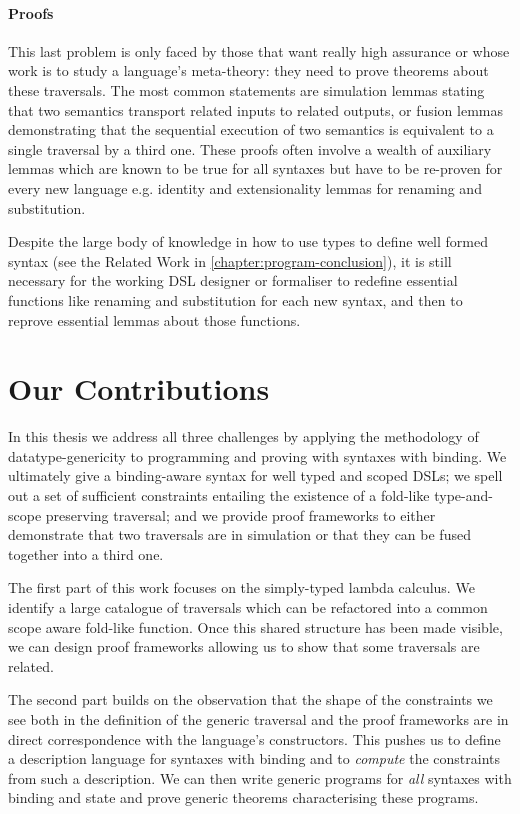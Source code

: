 \paragraph{Proofs} This last problem is only faced by those that want really high assurance or whose
work is to study a language's meta-theory: they need to prove theorems about these
traversals. The most common statements are simulation lemmas stating that two
semantics transport related inputs to related outputs, or fusion lemmas demonstrating
that the sequential execution of two semantics is equivalent to a single traversal
by a third one. These proofs often involve a wealth of auxiliary lemmas which are
known to be true for all syntaxes but have to be re-proven for every new language
e.g. identity and extensionality lemmas for renaming and substitution.

Despite the large body of knowledge in how to use types to define well formed
syntax (see the Related Work in \cref{chapter:program-conclusion}), it is still
necessary for the working DSL designer or formaliser to redefine essential
functions like renaming and substitution for each new syntax, and then to
reprove essential lemmas about those functions.

\section{Our Contributions}

In this thesis we address all three challenges by applying the methodology of
datatype-genericity to programming and proving with syntaxes with binding.
We ultimately give a binding-aware syntax for well typed and scoped DSLs; we
spell out a set of sufficient constraints entailing the existence of a fold-like
type-and-scope preserving traversal; and we provide proof frameworks
to either demonstrate that two traversals are in simulation or that they can be
fused together into a third one.

The first part of this work focuses on the simply-typed lambda calculus. We
identify a large catalogue of traversals which can be refactored into a common
scope aware fold-like function. Once this shared structure has been made
visible, we can design proof frameworks allowing us to show that some traversals
are related.

The second part builds on the observation that the shape of the constraints we
see both in the definition of the generic traversal and the proof frameworks
are in direct correspondence with the language's constructors. This pushes us
to define a description language for syntaxes with binding and to \emph{compute}
the constraints from such a description. We can then write generic programs for
\emph{all} syntaxes with binding and state and prove generic theorems characterising
these programs.

